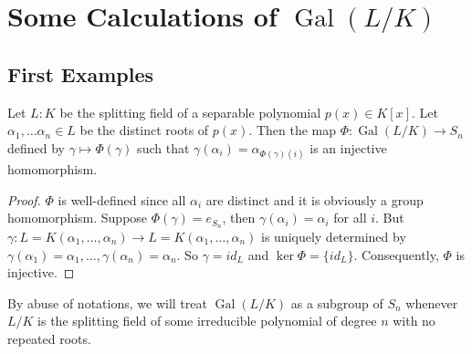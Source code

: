 \chapter{Some Calculations of $\operatorname{Gal}(L/K)$}
\section{First Examples}

\begin{proposition} \label{prop-injectToSymmetricGroups}
    Let $L:K$ be the splitting field of a separable polynomial $p(x)\in K[x]$. Let $\alpha_{1},\dots \alpha_{n}\in L$ be the distinct roots of $p(x)$. Then the map $\Phi:\operatorname{Gal}(L /K)\to S_{n}$ defined by $\gamma\mapsto \Phi(\gamma)$ such that $\gamma(\alpha_{i})=\alpha_{\Phi(\gamma)(i)}$ is an injective homomorphism. 
\end{proposition}

\begin{proof}
    $\Phi$ is well-defined since all $\alpha_{i}$ are distinct and it is obviously a group homomorphism. Suppose $\Phi(\gamma)=e_{S_{n}}$, then $\gamma(\alpha_{i})=\alpha_{i}$ for all $i$. But $\gamma:L=K(\alpha_{1},\dots, \alpha_{n})\to L=K(\alpha_{1},\dots, \alpha_{n})$ is uniquely determined by $\gamma(\alpha_{1})=\alpha_{1},\dots, \gamma(\alpha_{n})=\alpha_{n}$. So $\gamma=id_{L}$ and $\ker \Phi = \{id_L\}$. Consequently, $\Phi$ is injective. 
\end{proof}

By abuse of notations, we will treat $\operatorname{Gal}(L /K)$ as a subgroup of $S_{n}$ whenever $L /K$ is the splitting field of some irreducible polynomial of degree $n$ with no repeated roots. 

